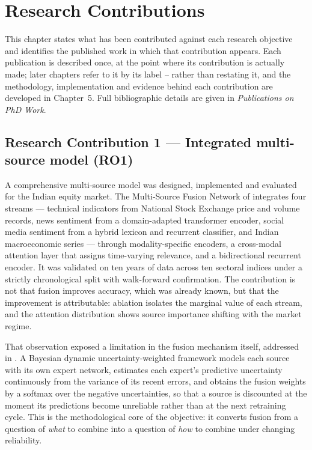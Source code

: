 \chapter{Research Contributions}

This chapter states what has been contributed against each research objective and
identifies the published work in which that contribution appears. Each publication is
described once, at the point where its contribution is actually made; later chapters refer
to it by its label -- rather than restating it, and the
methodology, implementation and evidence behind each contribution are developed in
Chapter~5. Full bibliographic details are given in \emph{Publications on PhD Work}.

\section{Research Contribution 1 --- Integrated multi-source model (RO1)}

A comprehensive multi-source model was designed, implemented and evaluated for the Indian
equity market. The Multi-Source Fusion Network of  integrates four streams ---
technical indicators from National Stock Exchange price and volume records, news sentiment
from a domain-adapted transformer encoder, social media sentiment from a hybrid lexicon and
recurrent classifier, and Indian macroeconomic series --- through modality-specific
encoders, a cross-modal attention layer that assigns time-varying relevance, and a
bidirectional recurrent encoder. It was validated on ten years of data across ten sectoral
indices under a strictly chronological split with walk-forward confirmation. The
contribution is not that fusion improves accuracy, which was already known, but that the
improvement is attributable: ablation isolates the marginal value of each stream, and the
attention distribution shows source importance shifting with the market regime.

That observation exposed a limitation in the fusion mechanism itself, addressed in
. A Bayesian dynamic uncertainty-weighted framework models each source with its
own expert network, estimates each expert's predictive uncertainty continuously from the
variance of its recent errors, and obtains the fusion weights by a softmax over the
negative uncertainties, so that a source is discounted at the moment its predictions become
unreliable rather than at the next retraining cycle. This is the methodological core of the
objective: it converts fusion from a question of \emph{what} to combine into a question of
\emph{how} to combine under changing reliability.

